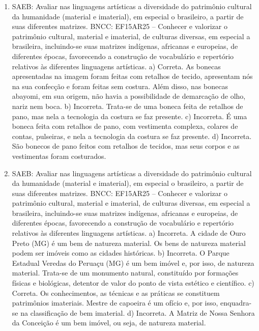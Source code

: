 \begin{enumerate}
\item
SAEB: Avaliar nas linguagens artísticas a diversidade do patrimônio
cultural da humanidade (material e imaterial), em especial o brasileiro,
a partir de suas diferentes matrizes. BNCC: EF15AR25 – Conhecer e valorizar
o patrimônio cultural, material e imaterial, de culturas diversas, em especial
a brasileira, incluindo-se suas matrizes indígenas, africanas e europeias, de
diferentes épocas, favorecendo a construção de vocabulário e repertório relativos
às diferentes linguagens artísticas.
a) Correta. As bonecas apresentadas na imagem foram feitas com retalhos
de tecido, apresentam nós na sua confecção e foram feitas sem costura.
Além disso, nas bonecas abayomi, em sua origem, não havia a
possibilidade de demarcação de olho, nariz nem boca.
b) Incorreta. Trata-se de uma boneca feita de retalhos de pano, mas nela
a tecnologia da costura se faz presente.
c) Incorreta. É uma boneca feita com retalhos de pano, com vestimenta
complexa, colares de contas, pulseiras, e nela a tecnologia da costura se
faz presente.
d) Incorreta. São bonecos de pano feitos com retalhos de tecidos, mas seus
corpos e as vestimentas foram costurados.

\item
SAEB: Avaliar nas linguagens artísticas a diversidade do patrimônio
cultural da humanidade (material e imaterial), em especial o brasileiro,
a partir de suas diferentes matrizes.
BNCC: EF15AR25 – Conhecer e valorizar o patrimônio cultural, material e
imaterial, de culturas diversas, em especial a brasileira, incluindo-se
suas matrizes indígenas, africanas e europeias, de diferentes épocas,
favorecendo a construção de vocabulário e repertório relativos às
diferentes linguagens artísticas.
a)  Incorreta. A cidade de Ouro Preto (MG) é um bem de natureza material.
  Os bens de natureza material podem ser imóveis como as cidades
  históricas.
b) Incorreta. O Parque Estadual Veredas do Peruaçu (MG) é um bem imóvel
  e, por isso, de natureza material. Trata-se de um monumento natural,
  constituído por formações físicas e biológicas, detentor de valor do
  ponto de vista estético e científico.
c) Correta. Os conhecimentos, as técnicas e as práticas se constituem
  patrimônios imateriais. Mestre de capoeira é um ofício e, por isso,
  enquadra-se na classificação de bem imaterial.
d) Incorreta. A Matriz de Nossa Senhora da Conceição é um bem imóvel, ou
  seja, de natureza material.


\end{enumerate}

